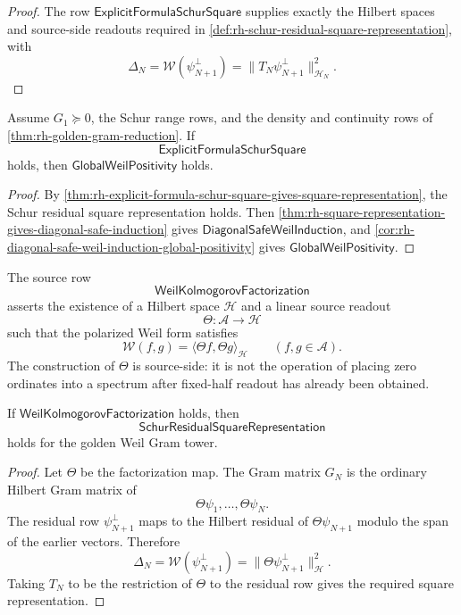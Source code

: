 \begin{proof}
The row $\mathsf{ExplicitFormulaSchurSquare}$ supplies exactly the
Hilbert spaces and source-side readouts required in
\autoref{def:rh-schur-residual-square-representation}, with
$$
\Delta_N=\mathcal W(\psi_{N+1}^{\perp})
=
\|T_N\psi_{N+1}^{\perp}\|_{\mathcal H_N}^2.
$$
\end{proof}

\begin{corollary}
\label{cor:rh-explicit-formula-schur-square-global-positivity}
Assume $G_1\succeq0$, the Schur range rows, and the density and
continuity rows of \autoref{thm:rh-golden-gram-reduction}.  If
$$
\mathsf{ExplicitFormulaSchurSquare}
$$
holds, then $\mathsf{GlobalWeilPositivity}$ holds.
\end{corollary}

\begin{proof}
By
\autoref{thm:rh-explicit-formula-schur-square-gives-square-representation},
the Schur residual square representation holds.  Then
\autoref{thm:rh-square-representation-gives-diagonal-safe-induction}
gives $\mathsf{DiagonalSafeWeilInduction}$, and
\autoref{cor:rh-diagonal-safe-weil-induction-global-positivity} gives
$\mathsf{GlobalWeilPositivity}$.
\end{proof}

\begin{definition}
\label{def:rh-weil-kolmogorov-factorization}
The source row
$$
\mathsf{WeilKolmogorovFactorization}
$$
asserts the existence of a Hilbert space $\mathcal H$ and a linear
source readout
$$
\Theta:\mathcal A\to\mathcal H
$$
such that the polarized Weil form satisfies
$$
\mathcal W(f,g)=
\langle \Theta f,\Theta g\rangle_{\mathcal H}
\qquad
(f,g\in\mathcal A).
$$
The construction of $\Theta$ is source-side: it is not the operation of
placing zero ordinates into a spectrum after fixed-half readout has
already been obtained.
\end{definition}

\begin{theorem}
\label{thm:rh-weil-kolmogorov-factorization-gives-schur-squares}
If $\mathsf{WeilKolmogorovFactorization}$ holds, then
$$
\mathsf{SchurResidualSquareRepresentation}
$$
holds for the golden Weil Gram tower.
\end{theorem}

\begin{proof}
Let $\Theta$ be the factorization map.  The Gram matrix $G_N$ is the
ordinary Hilbert Gram matrix of
$$
\Theta\psi_1,\ldots,\Theta\psi_N.
$$
The residual row $\psi_{N+1}^{\perp}$ maps to the Hilbert residual of
$\Theta\psi_{N+1}$ modulo the span of the earlier vectors.  Therefore
$$
\Delta_N
=
\mathcal W(\psi_{N+1}^{\perp})
=
\|\Theta\psi_{N+1}^{\perp}\|_{\mathcal H}^2.
$$
Taking $T_N$ to be the restriction of $\Theta$ to the residual row gives
the required square representation.
\end{proof}

